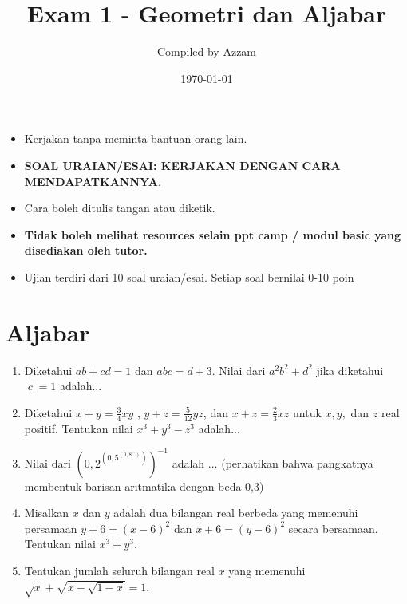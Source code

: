 \documentclass[11pt]{scrartcl}
\title{Exam 1 - Geometri dan Aljabar} %
\date{\today}
\author{Compiled by Azzam}
\begin{document}
\maketitle
\begin{remark*}
    \begin{itemize}
    \item Kerjakan tanpa meminta bantuan orang lain.
    \item \textbf{SOAL URAIAN/ESAI: KERJAKAN DENGAN CARA MENDAPATKANNYA}.
    \item Cara boleh ditulis tangan atau diketik. 
    \item \textbf{Tidak boleh melihat resources selain ppt camp / modul basic yang disediakan oleh tutor.}
    \item Ujian terdiri dari 10 soal uraian/esai. Setiap soal bernilai 0-10 poin
    \end{itemize}
\end{remark*}
\section{Aljabar}
\begin{enumerate}
      \item
		Diketahui $ab+cd=1$ dan $abc=d+3$. Nilai dari $a^2b^2+d^2$ jika diketahui $|c|=1$ adalah...


	\item
		Diketahui $x+y=\frac34 xy$ , $y+z=\frac{5}{12}yz$, dan $x+z=\frac23xz$ untuk $x,y,$ dan $z$ real positif. Tentukan nilai $x^3+y^3-z^3$ adalah...


		\item Nilai dari $\left(0,2 ^{\left(0,5 ^{\left(0,8 ^{...} \right)} \right)} \right)^{-1}$ adalah $\dots$ (perhatikan bahwa pangkatnya membentuk barisan aritmatika dengan beda 0,3)

    \item
		Misalkan $x$ dan $y$ adalah dua bilangan real berbeda yang memenuhi persamaan $y+6 = (x-6)^2$ dan $x+6 = (y-6)^2$ secara bersamaan. Tentukan nilai $x^3+y^3$.

		\item Tentukan jumlah seluruh bilangan real $x$ yang memenuhi $\sqrt{x}+\sqrt{x-\sqrt{1-x}}=1$.
\end{enumerate}

\
\end{document}
